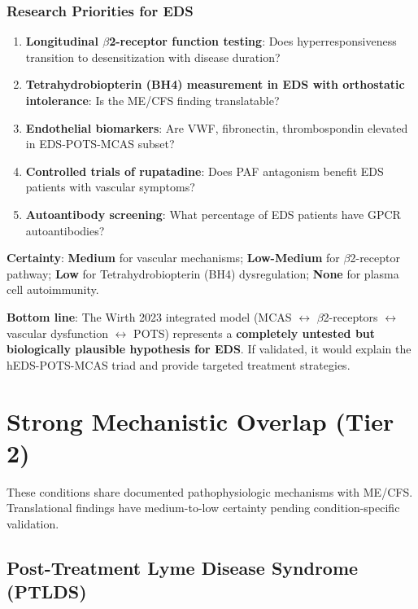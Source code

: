 \subsubsection{Research Priorities for EDS}

\begin{enumerate}
    \item \textbf{Longitudinal $\beta$2-receptor function testing}: Does hyperresponsiveness transition to desensitization with disease duration?
    \item \textbf{Tetrahydrobiopterin (BH4) measurement in EDS with orthostatic intolerance}: Is the ME/CFS finding translatable?
    \item \textbf{Endothelial biomarkers}: Are VWF, fibronectin, thrombospondin elevated in EDS-POTS-MCAS subset?
    \item \textbf{Controlled trials of rupatadine}: Does PAF antagonism benefit EDS patients with vascular symptoms?
    \item \textbf{Autoantibody screening}: What percentage of EDS patients have GPCR autoantibodies?
\end{enumerate}

\textbf{Certainty}: \textbf{Medium} for vascular mechanisms; \textbf{Low-Medium} for $\beta$2-receptor pathway; \textbf{Low} for Tetrahydrobiopterin (BH4) dysregulation; \textbf{None} for plasma cell autoimmunity.

\textbf{Bottom line}: The Wirth 2023 integrated model (MCAS $\leftrightarrow$ $\beta$2-receptors $\leftrightarrow$ vascular dysfunction $\leftrightarrow$ POTS) represents a \textbf{completely untested but biologically plausible hypothesis for EDS}. If validated, it would explain the hEDS-POTS-MCAS triad and provide targeted treatment strategies.

\section{Strong Mechanistic Overlap (Tier 2)}
\label{sec:tier2-conditions}

These conditions share documented pathophysiologic mechanisms with ME/CFS. Translational findings have medium-to-low certainty pending condition-specific validation.

\subsection{Post-Treatment Lyme Disease Syndrome (PTLDS)}
\label{sec:ptlds}

